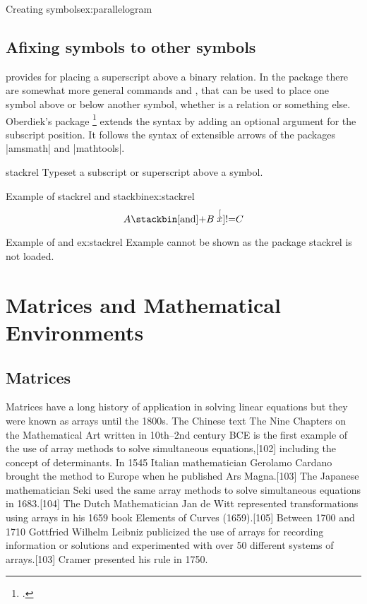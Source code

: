 {{{\begin{texexample}{Creating symbols}{ex:parallelogram}
\makeatother   
\end{texexample}
   
\section{Afixing symbols to other symbols}

\latex provides  for placing a superscript above a binary relation. In the  package there are somewhat more general commands  and , that can be used to place one symbol above or below another symbol, whether is a relation or something else. Oberdiek's package \footcite{stackrel} extends the syntax by adding an optional argument for the subscript position. It follows the syntax of extensible arrows of the packages |amsmath| and |mathtools|.

\begin{docCommand}{stackrel}{}
  Typeset a subscript or superscript above a symbol.
\end{docCommand}

\ifSTACKREL
\begin{texexample}{Example of stackrel and stackbin}{ex:stackrel}
\[
 A \stackbin[\text{and}]{}{+} B \stackrel[x]{!}{=} C
\] 
\end{texexample}
\else
\begin{texcode}{Example of  and }{ex:stackrel}
  Example cannot be shown as the package stackrel is not loaded.
\end{texcode}
\fi


\chapter{Matrices and Mathematical Environments}
\label{matrices}

\section{Matrices}

Matrices have a long history of application in solving linear equations but they were known as arrays until the 1800s. The Chinese text The Nine Chapters on the Mathematical Art written in 10th–2nd century BCE is the first example of the use of array methods to solve simultaneous equations,[102] including the concept of determinants. In 1545 Italian mathematician Gerolamo Cardano brought the method to Europe when he published Ars Magna.[103] The Japanese mathematician Seki used the same array methods to solve simultaneous equations in 1683.[104] The Dutch Mathematician Jan de Witt represented transformations using arrays in his 1659 book Elements of Curves (1659).[105] Between 1700 and 1710 Gottfried Wilhelm Leibniz publicized the use of arrays for recording information or solutions and experimented with over 50 different systems of arrays.[103] Cramer presented his rule in 1750.

}}}
